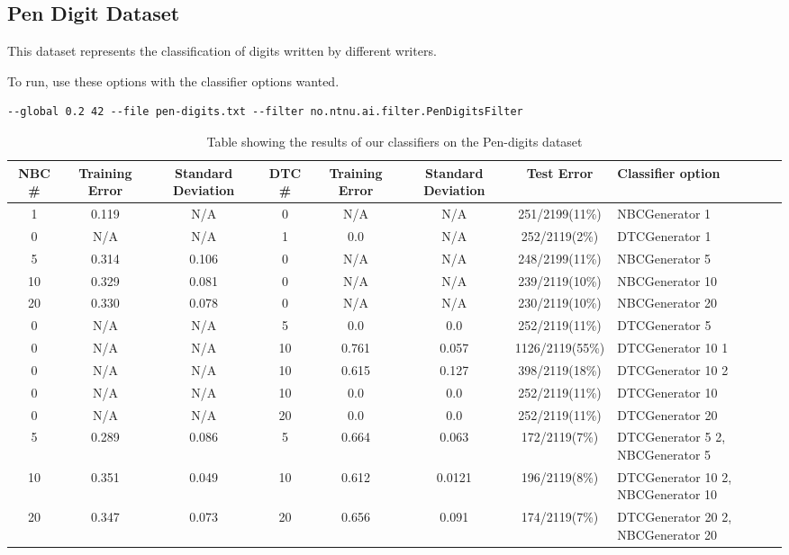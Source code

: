 \subsection{Pen Digit Dataset}\label{pen digit dataset}
This dataset represents the classification of digits written by different writers.

To run, use these options with the classifier options wanted.

\begin{lstlisting}[label=lst:pen, caption=Pen digit dataset general options]
--global 0.2 42 --file pen-digits.txt --filter no.ntnu.ai.filter.PenDigitsFilter
\end{lstlisting}

\begin{landscape}
\begin{table}
\begin{tabular}{|c|c|c||c|c|c||c||p{5cm}|}
\hline
NBC \# & Training Error & Standard Deviation & DTC \# & Training Error
& Standard Deviation & Test Error & Classifier option \\ \hline
1 & 0.119 & N/A & 0 & N/A & N/A & 251/2199(11\%) & NBCGenerator 1 \\ \hline
0 & N/A & N/A & 1 & 0.0 & N/A & 252/2119(2\%) & DTCGenerator 1 \\ \hline
5 & 0.314 & 0.106 & 0 & N/A & N/A & 248/2199(11\%) & NBCGenerator 5 \\ \hline
10 & 0.329 & 0.081 & 0 & N/A & N/A & 239/2119(10\%) & NBCGenerator 10 \\ \hline
20 & 0.330 & 0.078 & 0 & N/A & N/A & 230/2119(10\%) & NBCGenerator 20 \\ \hline
0 & N/A & N/A & 5 & 0.0 & 0.0 & 252/2119(11\%) & DTCGenerator 5 \\ \hline
0 & N/A & N/A & 10 & 0.761 & 0.057 & 1126/2119(55\%) & DTCGenerator 10 1 \\ \hline
0 & N/A & N/A & 10 & 0.615 & 0.127 & 398/2119(18\%) & DTCGenerator 10 2 \\ \hline
0 & N/A & N/A & 10 & 0.0 & 0.0 & 252/2119(11\%) & DTCGenerator 10 \\ \hline
0 & N/A & N/A & 20 & 0.0 & 0.0 & 252/2119(11\%)& DTCGenerator 20 \\ \hline
5 & 0.289 & 0.086 & 5 & 0.664 & 0.063 & 172/2119(7\%) & DTCGenerator 5 2, 
\newline NBCGenerator 5 \\ \hline
10 & 0.351 & 0.049 & 10 & 0.612 & 0.0121 & 196/2119(8\%) & DTCGenerator 10 2, 
\newline NBCGenerator 10 \\ \hline
20 & 0.347 & 0.073 & 20 & 0.656 & 0.091 & 174/2119(7\%) & DTCGenerator 20 2, 
\newline NBCGenerator 20 \\ \hline
\hline
\end{tabular}
\label{tab:pen}
\caption[Pen-digits dataset boosting]{Table showing the results of our 
classifiers on the Pen-digits dataset}
\end{table}
\end{landscape}
